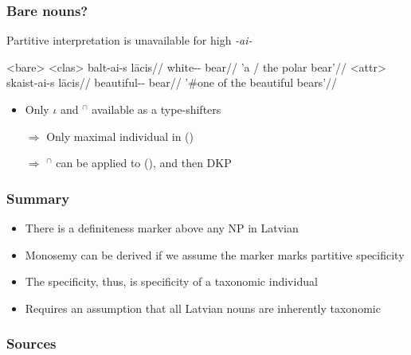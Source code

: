 \documentclass[9pt, t]{beamer}
\begin{document}
\begin{frame}
    \frametitle{Bare nouns?}

    Partitive interpretation is unavailable for high \textit{-ai-}

    \pex<bare>
        \a<clas> \begingl
            \gla balt-ai-s lācis//
            \glb white-\Def{}-\Nom{} bear//
            \glft 'a / the polar bear'//
        \endgl
        \a<attr> \begingl
            \gla skaist-ai-s lācis//
            \glb beautiful-\Def{}-\Nom{} bear//
            \glft '\#one of the beautiful bears'//
        \endgl
    \xe

    \pause
    \begin{itemize}
        \item Only $\iota $ and $^\cap$ available as a type-shifters 
        \item[$\Rightarrow$] Only maximal individual in ()
        \item[$\Rightarrow$] $^\cap$ can be applied to (), and then DKP \citep{chierchia1998}
    \end{itemize}


\end{frame}

\begin{frame}
    \frametitle{Summary}

    \begin{itemize}
        \item There is a definiteness marker above any NP in Latvian
        \item Monosemy can be derived if we assume the marker marks partitive specificity
        \item The specificity, thus, is specificity of a taxonomic individual
        \item Requires an assumption that all Latvian nouns are inherently taxonomic
        \end{itemize}

\end{frame}

\begin{frame}
    \frametitle{Sources}

    {\footnotesize }

\end{frame}
\end{document}
